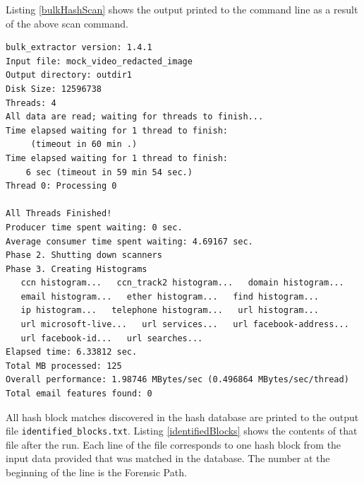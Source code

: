\documentclass[11pt,fleqn]{article} %
\begin{document}
Listing \ref{bulkHashScan} shows the output printed to the command line as a result of the above \bulk \hash scan command. \\

\lstset{style=customfile}
\begin{lstlisting}[float, caption=Output from \bulk \hash scan, label=bulkHashScan]
bulk_extractor version: 1.4.1
Input file: mock_video_redacted_image
Output directory: outdir1
Disk Size: 12596738
Threads: 4
All data are read; waiting for threads to finish...
Time elapsed waiting for 1 thread to finish:
     (timeout in 60 min .)
Time elapsed waiting for 1 thread to finish:
    6 sec (timeout in 59 min 54 sec.)
Thread 0: Processing 0

All Threads Finished!
Producer time spent waiting: 0 sec.
Average consumer time spent waiting: 4.69167 sec.
Phase 2. Shutting down scanners
Phase 3. Creating Histograms
   ccn histogram...   ccn_track2 histogram...   domain histogram...
   email histogram...   ether histogram...   find histogram...
   ip histogram...   telephone histogram...   url histogram...
   url microsoft-live...   url services...   url facebook-address...
   url facebook-id...   url searches...
Elapsed time: 6.33812 sec.
Total MB processed: 125
Overall performance: 1.98746 MBytes/sec (0.496864 MBytes/sec/thread)
Total email features found: 0
\end{lstlisting}

All hash block matches discovered in the hash database are printed to the \bulk output file \texttt{identified\_blocks.txt}. Listing \ref{identifiedBlocks} shows the contents of that file after the \bulk run. Each line of the file corresponds to one hash block from the input data provided that was matched in the database. The number at the beginning of the line is the Forensic Path.\\
\end{document}

